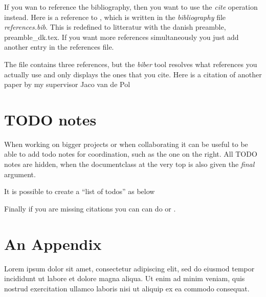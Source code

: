 \documentclass[english]{article}
\begin{document}
If you wan to reference the bibliography, then you want to use the \emph{cite}
operation instead. Here is a reference to \cite{ICALP:Hansen2020}, which is
written in the \emph{bibliography} file \emph{references.bib}. This is redefined
to litteratur with the danish preamble, preamble\_dk.tex. If you want more
references simultaneously you just add another entry in the references file.

The file contains three references, but the \emph{biber} tool resolves what
references you actually use and only displays the ones that you cite. Here is a
citation of another paper by my supervisor Jaco van de
Pol~\cite{STTT:bloemen2019}

\section{TODO notes}
When working on bigger projects or when collaborating it can be useful to be
able to add todo notes for coordination, such as the one on the right. All TODO
notes are hidden, when the documentclass at the very top is also given the
\emph{final} argument.


It is possible to create a ``list of todos'' as below

Finally if you are missing citations you can can do \todocite or
.

\printbibliography

\newpage \appendix
\section{An Appendix}
Lorem ipsum dolor sit amet, consectetur adipiscing elit, sed do eiusmod tempor
incididunt ut labore et dolore magna aliqua. Ut enim ad minim veniam, quis
nostrud exercitation ullamco laboris nisi ut aliquip ex ea commodo consequat.
\end{document}
